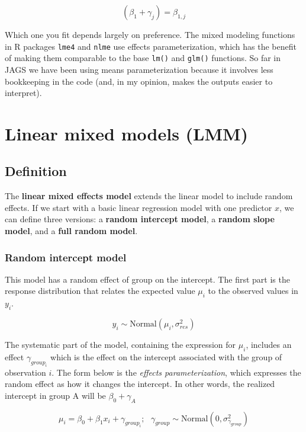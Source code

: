 \documentclass[
  13,
  letterpaper,
]{report}
\begin{document}
\[\left(\beta_1+\gamma_j\right)=\beta_{1,j}\]

Which one you fit depends largely on preference. The mixed modeling
functions in R packages \texttt{lme4} and \texttt{nlme} use effects
parameterization, which has the benefit of making them comparable to the
base \texttt{lm()} and \texttt{glm()} functions. So far in JAGS we have
been using means parameterization because it involves less bookkeeping
in the code (and, in my opinion, makes the outputs easier to interpret).

\section{Linear mixed models (LMM)}\label{sec-mixed-lmm}

\subsection{Definition}\label{sec-mixed-lmm-def}

The \textbf{linear mixed effects model} extends the linear model to
include random effects. If we start with a basic linear regression model
with one predictor \(x\), we can define three versions: a \textbf{random
intercept model}, a \textbf{random slope model}, and a \textbf{full
random model}.

\subsubsection{Random intercept model}\label{sec-mixed-lmm-def-randint}

This model has a random effect of group on the intercept. The first part
is the response distribution that relates the expected value \(\mu_i\)
to the observed values in \(y_i\).

\[y_i\sim\text{Normal}\left(\mu_i,\sigma^2_{res}\right)\]

The systematic part of the model, containing the expression for
\(\mu_i\), includes an effect \(\gamma_{group_i}\) which is the effect
on the intercept associated with the group of observation \(i\). The
form below is the \emph{effects parameterization}, which expresses the
random effect as how it changes the intercept. In other words, the
realized intercept in group A will be \(\beta_0+\gamma_A\)

\[\mu_i=\beta_0+\beta_1x_i+\gamma_{group_i};\text{ }\gamma_{group}\sim \text{Normal}\left(0,\sigma^2_{\gamma_{group}}\right)\]
\end{document}
